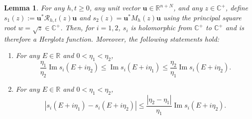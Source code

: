 \documentclass[11pt,reqno]{amsart}
\def\R{\mathbb{R}}
\def\u{\mathbf{u}}
\def\C{\mathbb{C}}
\def\cR{\mathcal{R}}
\def\Im{\operatorname{Im}}
\newtheorem{lemma}[theorem]{Lemma}
\theoremstyle{definition}
\numberwithin{equation}{section}
\numberwithin{figure}{section}
\begin{document}
\begin{lemma}\label{lem:Herglotz-function}
For any $h,t\geq 0$, any unit vector $\u\in\R^{n+N}$, and any $z\in\C^+$, define $s_1(z):=\u^*\cR_{h,t}(z)\u$ and $s_2(z)=\u^*M_h(z)\u$ using the principal square root $w=\sqrt{z}\in\C^+$. Then, for $i=1,2$, $s_i$ is holomorphic from $\C^+$ to $\C^+$ and is therefore a Herglotz function. Moreover, the following statements hold:
\begin{enumerate}[label=(\alph*)]
    \item For any $E\in\R$ and $0<\eta_1<\eta_2$,
    \[
        \frac{\eta_1}{\eta_2}\Im s_i(E+i\eta_2)\leq\Im s_i(E+i\eta_1)\leq \frac{\eta_2}{\eta_1}\Im s_i(E+i\eta_2).
    \]
    \item For any $E\in\R$ and $0<\eta_1<\eta_2$,
    \[
        |s_i(E+i\eta_1)-s_i(E+i\eta_2)|\leq \frac{|\eta_2-\eta_1|}{\eta_1}\Im s_i(E+i\eta_2).
    \]
\end{enumerate}
\end{lemma}
\end{document}
